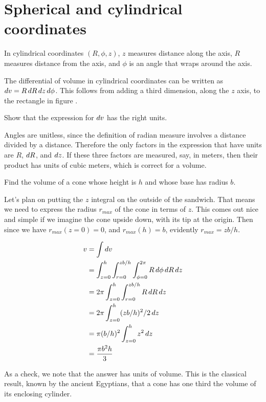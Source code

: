 \section{Spherical and cylindrical coordinates}

In cylindrical coordinates $(R,\phi,z)$,
$z$ measures distance
along the axis, $R$ measures distance from the axis, and $\phi$
is an angle that wraps around the axis.
%

The differential of volume in cylindrical coordinates can be
written as $\mathop{d\!} v = R \mathop{d\!} R \mathop{d\!} z \mathop{d\!} \phi$. This follows from adding a third dimension,
along the $z$ axis, to the rectangle in figure .

\begin{eg}
\egquestion Show that the expression for $\mathop{d\!} v$ has the right units.

\eganswer Angles are unitless, since the definition of radian measure involves a distance
divided by a distance. Therefore the only factors in the expression that have units
are $R$, $\mathop{d\!} R$, and $\mathop{d\!} z$. If these three factors are measured, say, in meters, then
their product has units of cubic meters, which is correct for a volume.
\end{eg}

\begin{eg}
\egquestion Find the volume of a cone whose height is $h$ and whose base has radius $b$.

\eganswer Let's plan on putting the $z$ integral on the outside of the sandwich. That means
we need to express the radius $r_{max}$ of the cone in terms of $z$. This comes out nice and
simple if we imagine the cone upside down, with its tip at the origin.
Then since we have $r_{max}(z=0)=0$, and $r_{max}(h)=b$, evidently $r_{max}=zb/h$.

\begin{align*}
  v &= \int \der v \\
    &= \int_{z=0}^h \int_{r=0}^{zb/h} \int_{\phi=0}^{2\pi} R \der\phi \der R \der z \\
    &= 2\pi \int_{z=0}^h \int_{r=0}^{zb/h} R \der R \der z \\
    &= 2\pi \int_{z=0}^h (zb/h)^2/2 \der z \\
    &= \pi (b/h)^2 \int_{z=0}^h z^2 \der z \\
    &= \frac{\pi b^2 h}{3}
\end{align*}

As a check, we note that the answer has units of volume. This is the classical result, known
by the ancient Egyptians, that a cone has one third the volume of its enclosing cylinder.
\end{eg}

